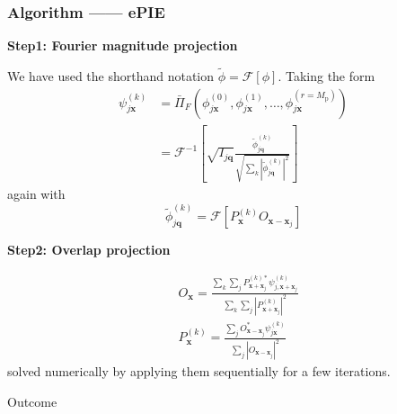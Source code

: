 \documentclass[UTF8]{beamer}
\begin{document}
\begin{frame}[c]\frametitle{Algorithm —— ePIE}



\noindent \textbf{Step1: Fourier magnitude projection}

We have used the shorthand notation $\tilde{\phi}=\mathcal{F}[\phi]$. Taking the form
$$
\begin{aligned}
\psi_{j \mathbf{x}}^{(k)} &=\bar{\Pi}_{F}\left(\phi_{j \mathbf{x}}^{(0)}, \phi_{j \mathbf{x}}^{(1)}, \ldots, \phi_{j \mathbf{x}}^{\left(r=M_{\mathrm{p}}\right)}\right) \\
&=\mathcal{F}^{-1}\left[\sqrt{I_{j \mathbf{q}}} \frac{\tilde{\phi}_{j \mathbf{q}}^{(k)}}{\sqrt{\sum_{k}\left|\tilde{\phi}_{j \mathbf{q}}^{(k)}\right|^{2}}}\right]
\end{aligned}
$$
again with
$$
\tilde{\phi}_{j \mathbf{q}}^{(k)}=\mathcal{F}\left[P_{\mathbf{x}}^{(k)} O_{\mathbf{x}-\mathbf{x}_{j}}\right]
$$


\end{frame}
\begin{frame}

\noindent \textbf{Step2: Overlap projection}

$$
\begin{aligned}
&O_{\mathbf{x}}=\frac{\sum_{k} \sum_{j} P_{\mathbf{x}+\mathbf{x}_{j}}^{(k) *} \psi_{j, \mathbf{x}+\mathbf{x}_{j}}^{(k)}}{\sum_{k} \sum_{j}\left|P_{\mathbf{x}+\mathbf{x}_{j}}^{(k)}\right|^{2}} \\
&P_{\mathbf{x}}^{(k)}=\frac{ \sum_{j} O_{\mathbf{x}-\mathbf{x}_{j}}^{*} \psi_{j \mathbf{x}}^{(k)}}{ \sum_{j}\left|O_{\mathbf{x}-\mathbf{x}_{j}}\right|^{2}}
\end{aligned}
$$
solved numerically by applying them sequentially for a few iterations.


\end{frame}

\begin{frame}{Outcome}

\end{frame}
\end{document}
